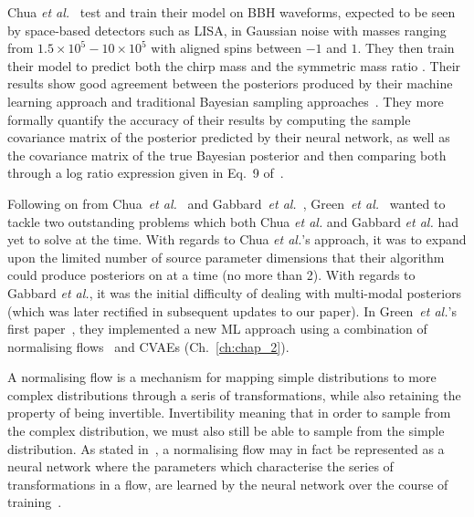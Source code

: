 Chua \textit{et al.}~\cite{2019arXiv190905966C} test and 
train their model on \ac{BBH} waveforms, expected to be seen  
by space-based detectors such as \ac{LISA}, in Gaussian 
noise with masses ranging 
from $1.5 \times 10^5 - 10 \times 10^5$ with aligned spins 
between $-1$ and $1$. They then train their 
model to predict both the chirp mass and the symmetric mass ratio 
. Their results show good agreement between the posteriors 
produced by their machine learning approach and traditional 
Bayesian sampling 
approaches~\cite{2019arXiv190905966C,PhysRevLett.122.211101}. They 
more formally quantify the accuracy of their results by computing 
the sample covariance matrix of the posterior predicted by 
their neural network, as well as the covariance matrix of the 
true Bayesian posterior and then comparing both through a log ratio 
expression given in Eq.~9 of~\cite{2019arXiv190905966C}.

%
%
Following on from Chua~\textit{et al.}~\cite{2019arXiv190905966C} and 
Gabbard~\textit{et al.}~\cite{1909.06296}, 
Green~\textit{et al.}~\cite{PhysRevD.102.104057} wanted to 
tackle two outstanding problems which both Chua \textit{et al.} and 
Gabbard \textit{et al.} had yet to solve at the time. With regards 
to Chua \textit{et al.}'s approach, it was to expand upon the 
limited number of source parameter dimensions that their algorithm 
could produce posteriors on at a time (no more than 2). With 
regards to Gabbard \textit{et al.}, it was the initial 
difficulty of dealing with multi-modal 
posteriors (which was later rectified in subsequent 
updates to our paper). In Green~\textit{et al.}'s first 
paper~\cite{PhysRevD.102.104057}, 
they implemented a new \ac{ML} approach using a combination of 
normalising flows~\cite{2015arXiv150505770J} and 
\ac{CVAE}s (Ch.~\ref{ch:chap_2}). 

A normalising flow  
is a mechanism for mapping simple distributions to more 
complex distributions through a seris of transformations, 
while also retaining the property of being 
invertible. Invertibility 
meaning that in order to sample from the complex distribution, we must 
also still be able to sample from the simple distribution. As stated 
in~\cite{2015arXiv150505770J}, 
a normalising flow may in fact be represented as a neural network where 
the parameters which characterise the series of transformations in a 
flow, are learned by the neural network over the course of
training~\cite{Cuoco_2020}.

